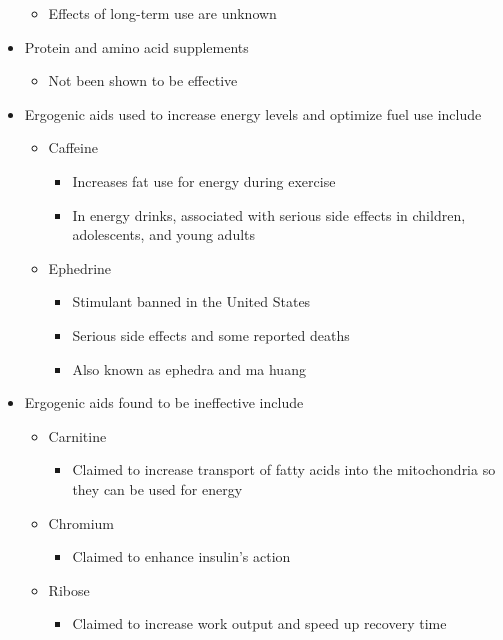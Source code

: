 \documentclass[title={Chapter 11}]{fdsn201notes}
\begin{document}
\begin{itemize}
\begin{itemize}
		\item Effects of long-term use are unknown
	\end{itemize}
	\item Protein and amino acid supplements
	\begin{itemize}
		\item Not been shown to be effective
	\end{itemize}
	\item Ergogenic aids used to increase energy levels and optimize fuel use include
	\begin{itemize}
		\item Caffeine
		\begin{itemize}
			\item Increases fat use for energy during exercise
			\item In energy drinks, associated with serious side effects in children, adolescents, and young adults
		\end{itemize}
		\item Ephedrine
		\begin{itemize}
			\item Stimulant banned in the United States
			\item Serious side effects and some reported deaths
			\item Also known as ephedra and ma huang
		\end{itemize}
	\end{itemize}
	\item Ergogenic aids found to be ineffective include
	\begin{itemize}
		\item Carnitine
		\begin{itemize}
			\item Claimed to increase transport of fatty acids into the mitochondria so they can be used for energy
		\end{itemize}
	\end{itemize}
	\begin{itemize}
		\item Chromium
		\begin{itemize}
			\item Claimed to enhance insulin’s action
		\end{itemize}
	\end{itemize}
	\begin{itemize}
		\item Ribose
		\begin{itemize}
			\item Claimed to increase work output and speed up recovery time

\end{itemize}
\end{itemize}
\end{itemize}
\end{document}

